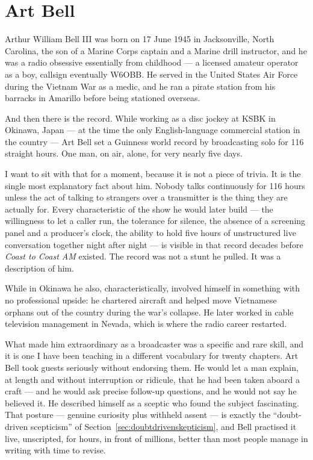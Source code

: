 \section{Art Bell}\label{sec:artbell}

Arthur William Bell III was born on 17 June 1945 in Jacksonville, North Carolina, the son of a Marine
Corps captain and a Marine drill instructor, and he was a radio obsessive essentially from childhood
--- a licensed amateur operator as a boy, callsign eventually W6OBB. He served in the United States Air
Force during the Vietnam War as a medic, and he ran a pirate station from his barracks in Amarillo
before being stationed overseas.

And then there is the record. While working as a disc jockey at KSBK in Okinawa, Japan --- at the time
the only English-language commercial station in the country --- Art Bell set a Guinness world record by
broadcasting solo for 116 straight hours. One man, on air, alone, for very nearly five days.

I want to sit with that for a moment, because it is not a piece of trivia. It is the single most
explanatory fact about him. Nobody talks continuously for 116 hours unless the act of talking to
strangers over a transmitter is the thing they are actually for. Every characteristic of the show he
would later build --- the willingness to let a caller run, the tolerance for silence, the absence of a
screening panel and a producer's clock, the ability to hold five hours of unstructured live
conversation together night after night --- is visible in that record decades before \emph{Coast to
Coast AM} existed. The record was not a stunt he pulled. It was a description of him.

While in Okinawa he also, characteristically, involved himself in something with no professional
upside: he chartered aircraft and helped move Vietnamese orphans out of the country during the
war's collapse. He later worked in cable television management in Nevada, which is where the radio
career restarted.

What made him extraordinary as a broadcaster was a specific and rare skill, and it is one I have been
teaching in a different vocabulary for twenty chapters. Art Bell took guests seriously without
endorsing them. He would let a man explain, at length and without interruption or ridicule, that he had
been taken aboard a craft --- and he would ask precise follow-up questions, and he would not say he
believed it. He described himself as a sceptic who found the subject fascinating. That posture ---
genuine curiosity plus withheld assent --- is exactly the ``doubt-driven scepticism'' of Section~\ref{sec:doubtdrivenskepticism},
and Bell practised it live, unscripted, for hours, in front of millions, better than most people
manage in writing with time to revise.

